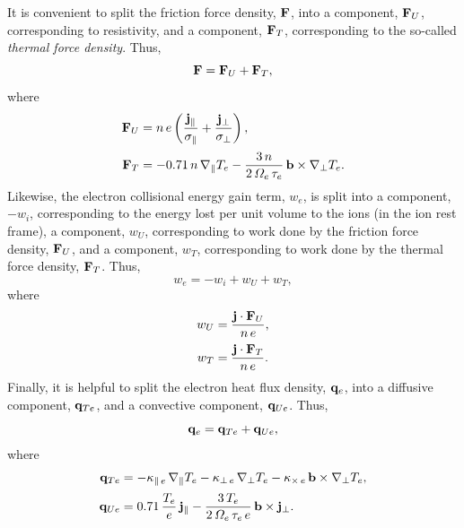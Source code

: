 \documentclass[notitlepage,12pt]{article}
\begin{document}
 It is convenient to split the friction force density,
${\bf F}$, into a component, ${\bf F}_U$, corresponding to resistivity, and a
component, ${\bf F}_T$, corresponding to the so-called {\em thermal force density}. Thus,
\begin{equation}
{\bf F} = {\bf F}_U+{\bf F}_T,
\end{equation}
where
\begin{align}
{\bf F}_U&= n\,e\left(\frac{{\bf j}_\parallel}{\sigma_\parallel}
+\frac{{\bf j}_\perp}{\sigma_\perp}\right), \\[0.5ex]
{\bf F}_T &= - 0.71\,n\,\nabla_\parallel T_e
-\frac{3\,n}{2\,{\mit\Omega}_e\,\tau_e}\,{\bf b}\times\nabla_\perp T_e.\label{e43}
\end{align}
Likewise, the electron collisional energy gain term, $w_e$, is split
into a component, $-w_i$, corresponding to the energy lost per unit volume to the ions (in the
ion rest frame), a component, $w_U$, corresponding to work done by the friction
force density, ${\bf F}_U$, and a component, $w_T$, corresponding to work done by the
thermal force density, ${\bf F}_T$. Thus,
\begin{equation}
w_e = -w_i + w_U + w_T,
\end{equation}
where
\begin{align}
w_U &= \frac{{\bf j}\cdot{\bf F}_U}{n\,e},\\[0.5ex]
w_T&= \frac{{\bf j}\cdot{\bf F}_T}{n\,e}.
\end{align}
Finally, it is helpful to split the electron heat flux density, ${\bf q}_e$, into
a diffusive component, ${\bf q}_{Te}$, and a convective component, ${\bf q}_{Ue}$. 
Thus,
\begin{equation}
{\bf q}_e = {\bf q}_{Te} + {\bf q}_{Ue},
\end{equation}
where
\begin{align}
{\bf q}_{Te} &=-\kappa_{\parallel\,e}\,\nabla_\parallel T_e -\kappa_{\perp\,e}\,
\nabla_\perp T_e
-\kappa_{\times\,e}\,{\bf b}\times\nabla_\perp T_e,\\[0.5ex]
{\bf q}_{Ue}&=  0.71\,\frac{T_e}{e}\,{\bf j}_\parallel-
\frac{3\,T_e}{2\,{\mit\Omega}_e\,\tau_e\,e}\,{\bf b}\times{\bf j}_\perp.
\end{align}
\end{document}
